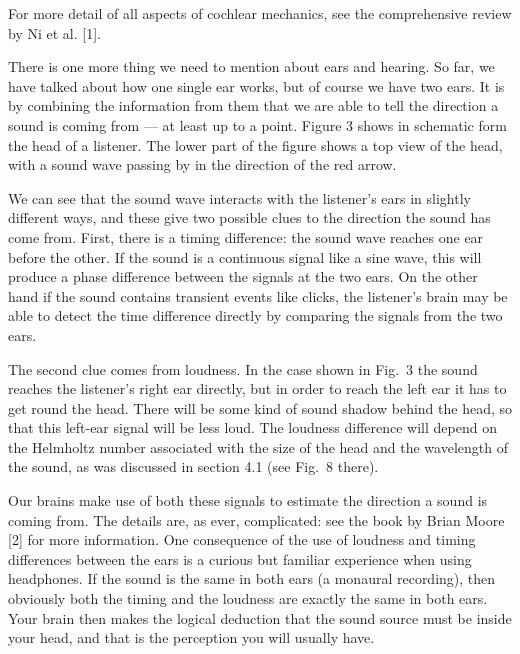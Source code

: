   For more detail of all aspects of cochlear mechanics, see the comprehensive 
  review by Ni et al. [1]. 

  There is one more thing we need to mention about ears and hearing. So far, we 
  have talked about how one single ear works, but of course we have two ears. 
  It is by combining the information from them that we are able to tell the 
  direction a sound is coming from — at least up to a point. Figure 3 shows in 
  schematic form the head of a listener. The lower part of the figure shows a 
  top view of the head, with a sound wave passing by in the direction of the 
  red arrow. 


  We can see that the sound wave interacts with the listener’s ears in slightly 
  different ways, and these give two possible clues to the direction the sound 
  has come from. First, there is a timing difference: the sound wave reaches 
  one ear before the other. If the sound is a continuous signal like a sine 
  wave, this will produce a phase difference between the signals at the two 
  ears. On the other hand if the sound contains transient events like clicks, 
  the listener’s brain may be able to detect the time difference directly by 
  comparing the signals from the two ears. 

  The second clue comes from loudness. In the case shown in Fig.\ 3 the sound 
  reaches the listener’s right ear directly, but in order to reach the left ear 
  it has to get round the head. There will be some kind of sound shadow behind 
  the head, so that this left-ear signal will be less loud. The loudness 
  difference will depend on the Helmholtz number associated with the size of 
  the head and the wavelength of the sound, as was discussed in section 4.1 
  (see Fig.\ 8 there). 

  Our brains make use of both these signals to estimate the direction a sound 
  is coming from. The details are, as ever, complicated: see the book by Brian 
  Moore [2] for more information. One consequence of the use of loudness and 
  timing differences between the ears is a curious but familiar experience when 
  using headphones. If the sound is the same in both ears (a monaural 
  recording), then obviously both the timing and the loudness are exactly the 
  same in both ears. Your brain then makes the logical deduction that the sound 
  source must be inside your head, and that is the perception you will usually 
  have. 

